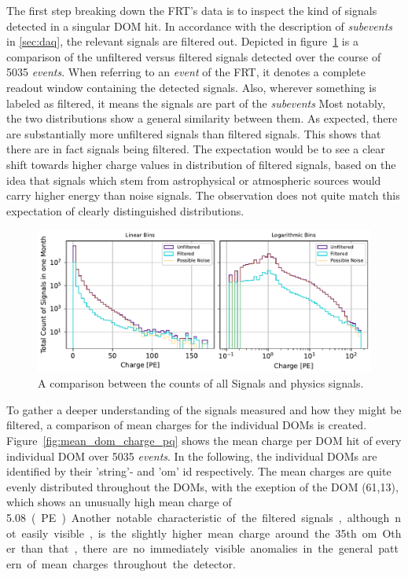The first step breaking down the FRT's data is to inspect the kind of signals detected in a singular DOM hit. In accordance with the description of 
\textit{subevents} in \ref{sec:daq}, the relevant signals are filtered out. Depicted in 
figure~\ref{fig:frt_mu_sub_comp_1} is a comparison of the unfiltered versus filtered signals detected over the course of \num{5035} \textit{events}. 
When referring to an \textit{event} of the FRT, it denotes a complete readout window containing the detected signals. Also, wherever something is labeled as filtered, 
it means the signals are part of the \textit{subevents}
Most notably, the two distributions show a 
general similarity between them. As expected, there are substantially more unfiltered signals than filtered signals. This shows that there are in fact signals 
being filtered. The expectation would be to see a clear shift towards higher 
charge values in distribution of filtered signals, based on the idea that signals which stem from astrophysical or atmospheric sources would carry higher energy 
than noise signals. The observation does not quite match this expectation of clearly distinguished distributions. 

\begin{figure}[H]
    \centering
    \includegraphics[width=\textwidth]{Plots/q_p_comp.pdf}
    \caption{A comparison between the counts of all Signals and physics signals.}
    \label{fig:frt_mu_sub_comp_1}
\end{figure}

To gather a deeper understanding of the signals measured and how they might be filtered, a comparison of mean charges for the individual DOMs is created. 
Figure~\ref{fig:mean_dom_charge_pq} shows the mean charge per DOM hit of every individual DOM over \num{5035} \textit{events}. In the following, the individual DOMs 
are identified by their 'string'- and 'om' id respectively.
The mean charges are quite evenly distributed throughout the DOMs, with the exeption of the DOM (61,13), which shows an unusually high mean charge of 
\num{5.08}~\unit(PE). Another notable characteristic of the filtered signals, although not easily visible, is the slightly higher mean charge around the 35th om. 
Other than that, there are no immediately visible anomalies in the general pattern of mean charges throughout the detector. 

